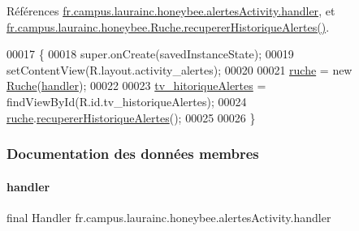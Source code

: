 Références \hyperlink{classfr_1_1campus_1_1laurainc_1_1honeybee_1_1alertes_activity_a79cdc606c07f6f7655c8c6351be23785}{fr.\+campus.\+laurainc.\+honeybee.\+alertes\+Activity.\+handler}, et \hyperlink{classfr_1_1campus_1_1laurainc_1_1honeybee_1_1_ruche_ace10a52a470257f2b8f161fc3c7b9f15}{fr.\+campus.\+laurainc.\+honeybee.\+Ruche.\+recuperer\+Historique\+Alertes()}.


\begin{DoxyCode}
00017                                                        \{
00018         super.onCreate(savedInstanceState);
00019         setContentView(R.layout.activity\_alertes);
00020 
00021         \hyperlink{classfr_1_1campus_1_1laurainc_1_1honeybee_1_1alertes_activity_a60ca5664100d5d388966a90342e7c93f}{ruche} = \textcolor{keyword}{new} \hyperlink{class_ruche}{Ruche}(\hyperlink{classfr_1_1campus_1_1laurainc_1_1honeybee_1_1alertes_activity_a79cdc606c07f6f7655c8c6351be23785}{handler});
00022 
00023         \hyperlink{classfr_1_1campus_1_1laurainc_1_1honeybee_1_1alertes_activity_a957b9ea11ac3b17e5058cb91f93500e3}{tv\_hitoriqueAlertes} = findViewById(R.id.tv\_historiqueAlertes);
00024         \hyperlink{classfr_1_1campus_1_1laurainc_1_1honeybee_1_1alertes_activity_a60ca5664100d5d388966a90342e7c93f}{ruche}.\hyperlink{classfr_1_1campus_1_1laurainc_1_1honeybee_1_1_ruche_ace10a52a470257f2b8f161fc3c7b9f15}{recupererHistoriqueAlertes}();
00025 
00026     \}
\end{DoxyCode}


\subsubsection{Documentation des données membres}
\mbox{\label{classfr_1_1campus_1_1laurainc_1_1honeybee_1_1alertes_activity_a79cdc606c07f6f7655c8c6351be23785}} 
\paragraph{\texorpdfstring{handler}{handler}}
{\footnotesize\ttfamily final Handler fr.\+campus.\+laurainc.\+honeybee.\+alertes\+Activity.\+handler\hspace{0.3cm}{\ttfamily [private]}}


